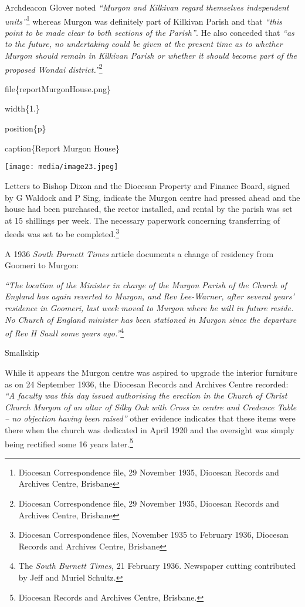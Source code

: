 Archdeacon Glover noted \emph{``Murgon and Kilkivan regard themselves independent units''}\footnote{Diocesan Correspondence file, 29 November 1935, Diocesan Records and Archives Centre, Brisbane} whereas Murgon was definitely part of Kilkivan Parish and that \emph{``this point to be made clear to both sections of the Parish''}. He also conceded that \emph{``as to the future, no undertaking could be given at the present time as to whether Murgon should remain in Kilkivan Parish or whether it should become part of the proposed Wondai district.''}\footnote{Diocesan Correspondence file, 29 November 1935, Diocesan Records and Archives Centre, Brisbane}

file\{reportMurgonHouse.png\}

width\{1.\}

position\{p\}

caption\{Report Murgon House\}

\texttt{[image: media/image23.jpeg]}

Letters to Bishop Dixon and the Diocesan Property and Finance Board, signed by G Waldock and P Sing, indicate the Murgon centre had pressed ahead and the house had been purchased, the rector installed, and rental by the parish was set at 15 shillings per week. The necessary paperwork concerning transferring of deeds was set to be completed.\footnote{Diocesan Correspondence files, November 1935 to February 1936, Diocesan Records and Archives Centre, Brisbane}

A 1936 \emph{South Burnett Times} article documents a change of residency from Goomeri to Murgon:

\emph{``The location of the Minister in charge of the Murgon Parish of the Church of England has again reverted to Murgon, and Rev Lee-Warner, after several years' residence in Goomeri, last week moved to Murgon where he will in future reside. No Church of England minister has been stationed in Murgon since the departure of Rev H Saull some years ago.''}\footnote{The \emph{South Burnett Times,} 21 February 1936. Newspaper cutting contributed by Jeff and Muriel Schultz.}

Smallskip

While it appears the Murgon centre was aspired to upgrade the interior furniture as on 24 September 1936, the Diocesan Records and Archives Centre recorded: \emph{``A faculty was this day issued authorising the erection in the Church of Christ Church Murgon of an altar of Silky Oak with Cross in centre and Credence Table -- no objection having been raised''} other evidence indicates that these items were there when the church was dedicated in April 1920 and the oversight was simply being rectified some 16 years later.\footnote{Diocesan Records and Archives Centre, Brisbane.}

